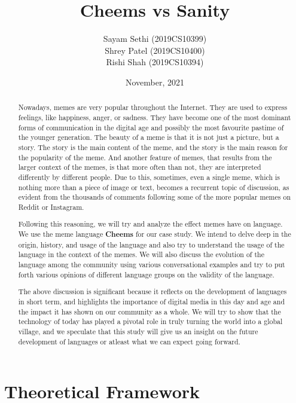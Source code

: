 \documentclass{article}
\title{Cheems vs Sanity}
\author{Sayam Sethi (2019CS10399)\\Shrey Patel (2019CS10400)\\Rishi Shah (2019CS10394)}
\date{November, 2021}
\begin{document}
\maketitle

\tableofcontents

\newpage

\begin{abstract}
    Nowadays, memes are very popular throughout the Internet. They are used to express feelings, like happiness, anger, or sadness. They have become one of the most dominant forms of communication in the digital age and possibly the most favourite pastime of the younger generation. The beauty of a meme is that it is not just a picture, but a story. The story is the main content of the meme, and the story is the main reason for the popularity of the meme. And another feature of memes, that results from the larger context of the memes,  is that more often than not, they are interpreted differently by different people. Due to this, sometimes, even a single meme, which is nothing more than a piece of image or text, becomes a recurrent topic of discussion, as evident from the thousands of comments following some of the more popular memes on Reddit or Instagram.

    Following this reasoning, we will try and analyze the effect memes have on language. We use the meme language \textbf{Cheems} for our case study. We intend to delve deep in the origin, history, and usage of the language and also try to understand the usage of the language in the context of the memes. We will also discuss the evolution of the language among the community using various conversational examples and try to put forth various opinions of different language groups on the validity of the language.

    The above discussion is significant because it reflects on the development of languages in short term, and highlights the importance of digital media in this day and age and the impact it has shown on our community as a whole. We will try to show that the technology of today has played a pivotal role in truly turning the world into a global village, and we speculate that this study will give us an insight on the future development of languages or atleast what we can expect going forward.
\end{abstract}

\section{Theoretical Framework}
\end{document}
